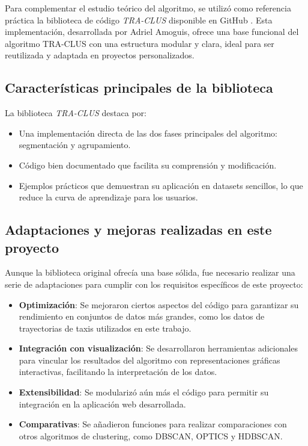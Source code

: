 Para complementar el estudio teórico del algoritmo, se utilizó como referencia práctica la biblioteca de código \emph{TRA-CLUS} disponible en GitHub \cite{traclus_library}. Esta implementación, desarrollada por Adriel Amoguis, ofrece una base funcional del algoritmo TRA-CLUS con una estructura modular y clara, ideal para ser reutilizada y adaptada en proyectos personalizados.

\subsection{Características principales de la biblioteca}

La biblioteca \emph{TRA-CLUS} destaca por:

\begin{itemize}
    \item Una implementación directa de las dos fases principales del algoritmo: segmentación y agrupamiento.
    \item Código bien documentado que facilita su comprensión y modificación.
    \item Ejemplos prácticos que demuestran su aplicación en datasets sencillos, lo que reduce la curva de aprendizaje para los usuarios.
\end{itemize}

\subsection{Adaptaciones y mejoras realizadas en este proyecto}

Aunque la biblioteca original ofrecía una base sólida, fue necesario realizar una serie de adaptaciones para cumplir con los requisitos específicos de este proyecto:

\begin{itemize}
    \item \textbf{Optimización}: Se mejoraron ciertos aspectos del código para garantizar su rendimiento en conjuntos de datos más grandes, como los datos de trayectorias de taxis utilizados en este trabajo.
    \item \textbf{Integración con visualización}: Se desarrollaron herramientas adicionales para vincular los resultados del algoritmo con representaciones gráficas interactivas, facilitando la interpretación de los datos.
    \item \textbf{Extensibilidad}: Se modularizó aún más el código para permitir su integración en la aplicación web desarrollada.
    \item \textbf{Comparativas}: Se añadieron funciones para realizar comparaciones con otros algoritmos de clustering, como DBSCAN, OPTICS y HDBSCAN.
\end{itemize}

